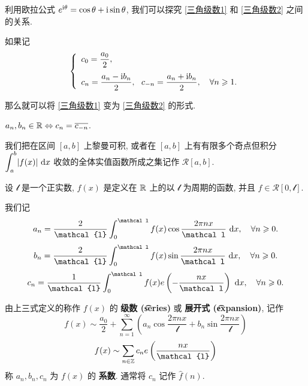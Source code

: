 利用欧拉公式 $e^{\ti\theta}=\cos\theta+\ti\sin\theta$, 我们可以探究 \eqref{三角级数1} 和 \eqref{三角级数2} 之间的关系.

如果记 \begin{equation}
	\left\{\begin{array}{l}
		c_0 = \dfrac{a_0} 2,\\[10pt]
		c_n = \dfrac{a_n-\ti b_n} 2,\ \ c_{-n} = \dfrac{a_n+\ti b_n} 2,\quad \forall n\geqslant 1.
	\end{array}\right.
\end{equation}

那么就可以将 \eqref{三角级数1} 变为 \eqref{三角级数2} 的形式.

\begin{remark}
	$a_n,b_n\in\R\Leftrightarrow c_n=\overline{c_{-n}}$.
\end{remark}

我们把在区间 $[a,b]$ 上黎曼可积, 或者在 $[a,b]$ 上有有限多个奇点但积分 $\mint[a]^b |f(x)|\td x$ 收敛的全体实值函数所成之集记作 $\mathscr{R}[a,b]$.

\begin{definition}
	设 $\mathcal l$ 是一个正实数, $f(x)$ 是定义在 $\R$ 上的以 $\mathcal l$ 为周期的函数, 并且 $f\in \mathscr{R}[0,\mathcal l]$.

	我们记
	\begin{equation}\label{flya}
		a_n=\frac 2{\mathcal{l}} \int_0^{\mathcal l} f(x)\cos\frac{2\pi n x}{\mathcal l}\td x,\quad \forall n\geqslant 0.
	\end{equation}
	\begin{equation}\label{flyb}
	b_n=\frac 2{\mathcal{l}} \int_0^{\mathcal l} f(x)\sin\frac{2\pi n x}{\mathcal l}\td x,\quad \forall n\geqslant 0.
	\end{equation}
	\begin{equation}\label{flyc}
	c_n=\frac 1{\mathcal{l}} \int_0^{\mathcal l} f(x)e\left(-\frac{nx}{\mathcal l}\right)\td x,\quad \forall n\geqslant 0.
	\end{equation}

	由上三式定义的称作 $f(x)$ 的 \textbf{\fly 级数 (\fly\t{series})} 或 \textbf{\fly 展开式 (\fly\t{expansion})}, 记作
	\begin{equation*}
		f(x)\sim\frac{a_0} 2+\sum\limits_{n=1}^\infty\left(a_n\cos\frac{2\pi nx}{\mathcal l}+b_n\sin\frac{2\pi nx}{\mathcal l}\right)
	\end{equation*}
	\begin{equation*}
		f(x)\sim\sum\limits_{n\in\Z} c_ne\left(\frac{nx}{\mathcal{l}}\right)
	\end{equation*}
	称 $a_n,b_n,c_n$ 为 $f(x)$ 的 \textbf{\fly 系数}. 通常将 $c_n$ 记作 $\hat{f}(n)$.
\end{definition}

